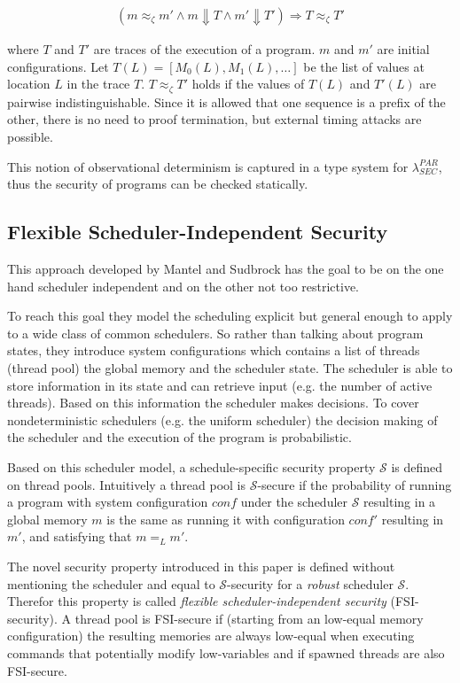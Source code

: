 \documentclass[a4paper,10pt]{llncs}
\begin{document}
\begin{align*}
(m \approx_\zeta m' \land m \Downarrow T \land m' \Downarrow T') \Rightarrow T \approx_\zeta T'
\end{align*}

where $T$ and $T'$ are traces of the execution of a program. $m$ and $m'$ are initial configurations.
Let $T(L) = [M_0(L), M_1(L), \dots]$ be the list of values at location $L$ in the trace $T$.
$T \approx_\zeta T'$ holds if the values of $T(L)$ and $T'(L)$ are pairwise indistinguishable. Since
it is allowed that one sequence is a prefix of the other, there is no need to proof termination, but
external timing attacks are possible.

This notion of observational determinism is captured in a type system for $\lambda_{SEC}^{PAR}$, thus
the security of programs can be checked statically.

\subsection{Flexible Scheduler-Independent Security\cite{Mantel10}}
This approach developed by Mantel and Sudbrock has the goal to be on the one hand
scheduler independent and on the other not too restrictive.

To reach this goal they model the scheduling explicit but general enough to apply
to a wide class of common schedulers. So rather than talking about program states,
they introduce system configurations which contains a list of threads (thread pool) the global
memory and the scheduler state. The scheduler is able to store information in its
state and can retrieve input (e.g. the number of active threads). Based on this
information the scheduler makes decisions. To cover nondeterministic schedulers
(e.g. the uniform scheduler) the decision making of the scheduler and the execution
of the program is probabilistic.

Based on this scheduler model, a schedule-specific security property $\mathcal{S}$ is
defined on thread pools. Intuitively a thread pool is $\mathcal{S}$-secure if the
probability of running a program with system configuration $conf$ under the scheduler $\mathcal{S}$
resulting in a global memory $m$ is the same as running it with configuration $conf'$ resulting in $m'$,
and satisfying that $m =_L m'$.

The novel security property introduced in this paper is defined without mentioning the
scheduler and equal to $\mathcal{S}$-security for a \textit{robust} scheduler $\mathcal{S}$.
Therefor this property is called \textit{flexible scheduler-independent security} (FSI-security).
A thread pool is FSI-secure if (starting from an low-equal memory configuration) the resulting
memories are always low-equal when executing commands that potentially modify low-variables and if
spawned threads are also FSI-secure.
\end{document}
